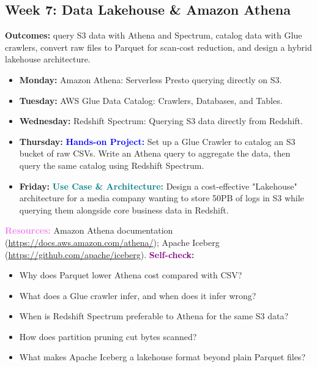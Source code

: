 \documentclass[11pt, a4paper]{article}
\newcommand{\project}[1]{\vspace{1mm}\noindent\textbf{\textcolor{blue}{Hands-on Project:}} #1}
\newcommand{\usecase}[1]{\vspace{1mm}\noindent\textbf{\textcolor{teal}{Use Case \& Architecture:}} #1}
\newcommand{\dayitem}[2]{\item \textbf{#1:} #2}
\newcommand{\resources}[1]{\vspace{1mm}\noindent\textbf{\textcolor{violet}{Resources:}} #1}
\newcommand{\selfcheck}[1]{\vspace{1mm}\noindent\textbf{\textcolor{purple}{Self-check:}} #1}
\begin{document}
\subsection*{Week 7: Data Lakehouse \& Amazon Athena}
\par\noindent\textbf{Outcomes:} query S3 data with Athena and Spectrum, catalog data with Glue crawlers, convert raw files to Parquet for scan-cost reduction, and design a hybrid lakehouse architecture.
\begin{itemize}[label=-]
    \dayitem{Monday}{Amazon Athena: Serverless Presto querying directly on S3.}
    \dayitem{Tuesday}{AWS Glue Data Catalog: Crawlers, Databases, and Tables.}
    \dayitem{Wednesday}{Redshift Spectrum: Querying S3 data directly from Redshift.}
    \dayitem{Thursday}{\project{Set up a Glue Crawler to catalog an S3 bucket of raw CSVs. Write an Athena query to aggregate the data, then query the same catalog using Redshift Spectrum.}}
    \dayitem{Friday}{\usecase{Design a cost-effective "Lakehouse" architecture for a media company wanting to store 50PB of logs in S3 while querying them alongside core business data in Redshift.}}
\end{itemize}
\resources{Amazon Athena documentation (\url{https://docs.aws.amazon.com/athena/}); Apache Iceberg (\url{https://github.com/apache/iceberg}).}
\selfcheck{\begin{itemize}[label=-, leftmargin=1.5em, itemsep=0pt]
    \item Why does Parquet lower Athena cost compared with CSV?
    \item What does a Glue crawler infer, and when does it infer wrong?
    \item When is Redshift Spectrum preferable to Athena for the same S3 data?
    \item How does partition pruning cut bytes scanned?
    \item What makes Apache Iceberg a lakehouse format beyond plain Parquet files?
\end{itemize}}
\end{document}
